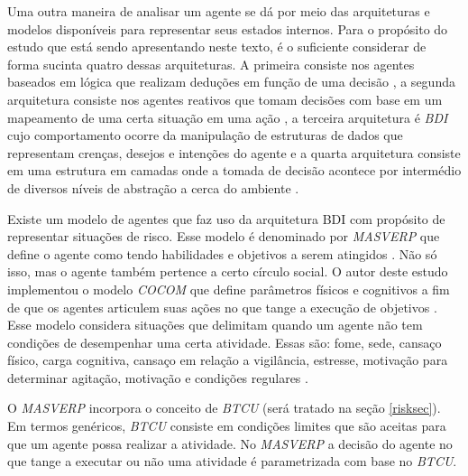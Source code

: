 Uma outra maneira de analisar um agente se dá por meio das arquiteturas e modelos disponíveis para representar seus estados internos. Para o propósito do estudo que está sendo apresentando neste texto, é o suficiente considerar de forma sucinta quatro dessas arquiteturas. A primeira consiste nos agentes baseados em lógica que realizam deduções em função de uma decisão \cite{logicagent}, a segunda arquitetura consiste nos agentes reativos que tomam decisões com base em um mapeamento de uma certa situação em uma  ação \cite{reactiveagent}, a terceira arquitetura é \textit{BDI} cujo comportamento ocorre da manipulação de estruturas de dados que representam crenças, desejos e intenções do agente \cite{bdi} e a quarta arquitetura consiste em uma estrutura em camadas onde a tomada de decisão acontece por intermédio de diversos níveis de abstração a cerca do ambiente \cite{layeragent,whatisagent}.  

Existe um modelo de agentes que faz uso da arquitetura BDI com propósito de representar situações de risco. Esse modelo é denominado por \textit{MASVERP} que define o agente como tendo habilidades e objetivos a serem atingidos \cite{mavesp}. Não só isso, mas o agente também pertence a certo círculo social. O autor deste estudo implementou o modelo \textit{COCOM} que define parâmetros físicos e cognitivos a fim de que os agentes articulem suas ações no que tange a execução de objetivos \cite{mavesp}. Esse modelo considera situações que delimitam quando um agente não tem condições de desempenhar uma certa atividade. Essas são: fome, sede, cansaço físico, carga cognitiva, cansaço em relação a vigilância, estresse, motivação para determinar agitação, motivação e condições regulares \cite{mavesp}. 

O \textit{MASVERP} incorpora o conceito de \textit{BTCU} (será tratado na seção \ref{risksec}). Em termos genéricos, \textit{BTCU} consiste em condições limites que são aceitas para que um agente possa realizar a atividade. No \textit{MASVERP} a decisão do agente no que tange a executar ou não uma atividade é parametrizada com base no \textit{BTCU}. 